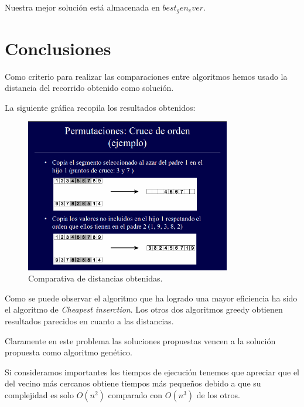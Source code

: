 \documentclass{article}
\begin{document}
Nuestra mejor solución está almacenada en $best_gen_ever$.

\section{Conclusiones}

Como criterio para realizar las comparaciones entre algoritmos hemos usado la
distancia del recorrido obtenido como solución.

La siguiente gráfica recopila los resultados obtenidos:

\begin{figure}[H]
  \centering
  \includegraphics[width=0.8\textwidth]{imag1.png}
  \caption{Comparativa de distancias obtenidas.}
\end{figure}

Como se puede observar el algoritmo que ha logrado una mayor
eficiencia ha sido el algoritmo de \textit{Cheapest inserction}. Los
otros dos algoritmos greedy obtienen resultados parecidos en cuanto a
las distancias.

Claramente en este problema las soluciones propuestas vencen a la
solución propuesta como algoritmo genético.

Si consideramos importantes los tiempos de ejecución tenemos que
apreciar que el del vecino más cercanos obtiene tiempos más pequeños
debido a que su complejidad es solo $O(n^2)$ comparado con $O(n^3)$ de
los otros.
\end{document}
